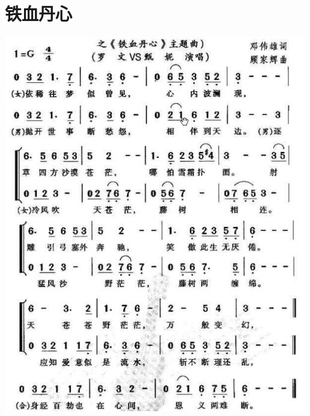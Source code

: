 \documentclass[cn,pad,chinese,chinesefont=nofont]{elegantbook}
\begin{document}
\section{铁血丹心}
    \includegraphics[width=\textwidth]{dongxiao/铁血丹心.jpg}
    
\end{document}
